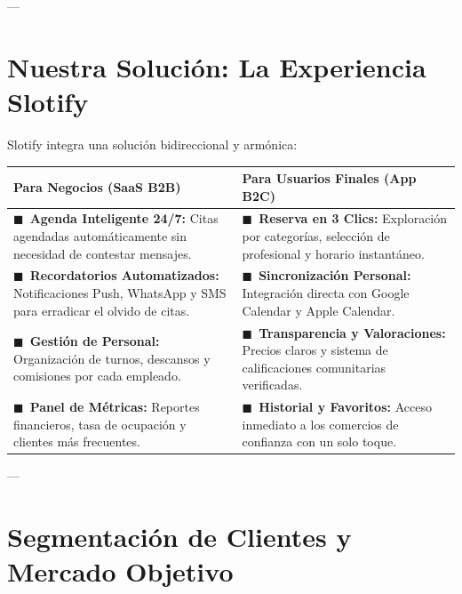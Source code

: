 \documentclass[11pt,a4paper]{article}
\newcommand{\bulletBlue}{\textcolor{primaryBlue}{\footnotesize$\blacksquare$}\ }
\newcommand{\bulletTeal}{\textcolor{accentTeal}{\footnotesize$\blacksquare$}\ }
\newcommand{\destacado}[2]{\noindent\bulletBlue\textbf{#1:} #2\par\vspace{3pt}}
\newcommand{\destacadoTeal}[2]{\noindent\bulletTeal\textbf{#1:} #2\par\vspace{3pt}}
\begin{document}
---

\section{Nuestra Solución: La Experiencia Slotify}

Slotify integra una solución bidireccional y armónica:

\begin{center}
\begin{tabularx}{\textwidth}{|X|X|}
\hline
\rowcolor{lightGray}
\textbf{\color{primaryDark}Para Negocios (SaaS B2B)} & \textbf{\color{primaryDark}Para Usuarios Finales (App B2C)} \\
\hline
\destacadoTeal{Agenda Inteligente 24/7}{Citas agendadas automáticamente sin necesidad de contestar mensajes.} & 
\destacado{Reserva en 3 Clics}{Exploración por categorías, selección de profesional y horario instantáneo.} \\
\hline
\destacadoTeal{Recordatorios Automatizados}{Notificaciones Push, WhatsApp y SMS para erradicar el olvido de citas.} & 
\destacado{Sincronización Personal}{Integración directa con Google Calendar y Apple Calendar.} \\
\hline
\destacadoTeal{Gestión de Personal}{Organización de turnos, descansos y comisiones por cada empleado.} & 
\destacado{Transparencia y Valoraciones}{Precios claros y sistema de calificaciones comunitarias verificadas.} \\
\hline
\destacadoTeal{Panel de Métricas}{Reportes financieros, tasa de ocupación y clientes más frecuentes.} & 
\destacado{Historial y Favoritos}{Acceso inmediato a los comercios de confianza con un solo toque.} \\
\hline
\end{tabularx}
\end{center}

---

\section{Segmentación de Clientes y Mercado Objetivo}
\end{document}
